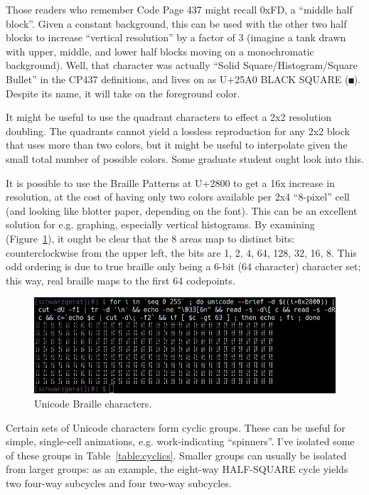 Those readers who remember Code Page 437 might recall 0xFD, a ``middle half
block''. Given a constant background, this can be used with the other two
half blocks to increase ``vertical resolution'' by a factor of 3 (imagine a
tank drawn with upper, middle, and lower half blocks moving on a monochromatic
background). Well, that character was actually ``Solid Square/Histogram/Square Bullet''
in the CP437 definitions\cite{cp437}, and lives on as U+25A0 BLACK SQUARE (\texttt{■}).
Despite its name, it will take on the foreground color.

It might be useful to use the quadrant characters to effect a 2x2 resolution
doubling. The quadrants cannot yield a lossless reproduction for any 2x2 block
that uses more than two colors, but it might be useful to interpolate given the
small total number of possible colors. Some graduate student ought look
into this.

It is possible to use the Braille Patterns at U+2800 to get a 16x increase in
resolution, at the cost of having only two colors available per 2x4 ``8-pixel''
cell (and looking like blotter paper, depending on the font). This can be an
excellent solution for e.g. graphing, especially vertical histograms. By
examining (Figure~\ref{fig:braille}), it ought be clear that the 8 areas
map to distinct bits: counterclockwise from the upper left, the bits are 1, 2,
4, 64, 128, 32, 16, 8. This odd ordering is due to true braille only being a
6-bit (64 character) character set; this way, real braille maps to the first
64 codepoints.

\begin{figure}[!htb]
    \centering
    \includegraphics[width=1\linewidth]{media/braille-unicode.png}
    \caption{Unicode Braille characters.}
    \label{fig:braille}
\end{figure}

Certain sets of Unicode characters form cyclic groups. These can be useful for
simple, single-cell animations, e.g. work-indicating ``spinners''. I've isolated
some of these groups in Table~\ref{table:cyclics}. Smaller groups can usually
be isolated from larger groups: as an example, the eight-way HALF-SQUARE cycle
yields two four-way subcycles and four two-way subcycles.

